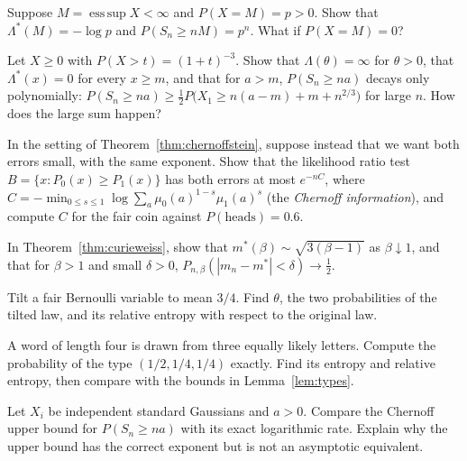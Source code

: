 \begin{exercise}[$\star\star$]\label{ex:endpoint}
Suppose $M=\operatorname{ess\,sup}X<\infty$ and $P(X=M)=p>0$. Show that $\Lambda^*(M)=-\log p$ and $P(S_n\ge nM)=p^n$. What if $P(X=M)=0$?
\end{exercise}

\begin{exercise}[$\star\star$]\label{ex:heavyld}
Let $X\ge0$ with $P(X>t)=(1+t)^{-3}$. Show that $\Lambda(\theta)=\infty$ for $\theta>0$, that $\Lambda^*(x)=0$ for every $x\ge m$, and that for $a>m$,
$P(S_n\ge na)$ decays only polynomially: $P(S_n\ge na)\ge\frac12P\bigl(X_1\ge n(a-m)+m+n^{2/3}\bigr)$ for large $n$. How does the large sum happen?
\end{exercise}

\begin{exercise}[$\star\star$]\label{ex:testcoin}
In the setting of Theorem~\ref{thm:chernoffstein}, suppose instead that we want both errors small, with the same exponent. Show that the likelihood ratio test
$B=\{x:P_0(x)\ge P_1(x)\}$ has both errors at most $e^{-nC}$, where $C=-\min_{0\le s\le1}\log\sum_a\mu_0(a)^{1-s}\mu_1(a)^s$ (the \emph{Chernoff information}), and compute $C$ for the fair coin
against $P(\text{heads})=0.6$.
\end{exercise}

\begin{exercise}[$\star\star$]\label{ex:curieweiss}
In Theorem~\ref{thm:curieweiss}, show that $m^*(\beta)\sim\sqrt{3(\beta-1)}$ as $\beta\downarrow1$, and that for $\beta>1$ and small $\delta>0$, $P_{n,\beta}(|m_n-m^*|<\delta)\to\frac12$.
\end{exercise}

\begin{exercise}[$\star$]\label{ex:v11-ch07-tilt}
Tilt a fair Bernoulli variable to mean $3/4$. Find $\theta$, the two probabilities of the tilted law, and its relative entropy with respect to the original law.
\end{exercise}

\begin{exercise}[$\star\star$]\label{ex:v11-ch07-type}
A word of length four is drawn from three equally likely letters. Compute the probability of the type $(1/2,1/4,1/4)$ exactly. Find its entropy and relative entropy, then compare with the bounds in Lemma~\ref{lem:types}.
\end{exercise}

\begin{exercise}[$\star\star$]\label{ex:v11-ch07-normal}
Let $X_i$ be independent standard Gaussians and $a>0$. Compare the Chernoff upper bound for $P(S_n\ge na)$ with its exact logarithmic rate. Explain why the upper bound has the correct exponent but is not an asymptotic equivalent.
\end{exercise}

